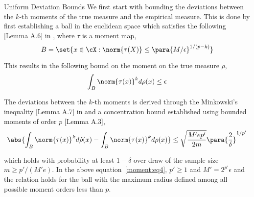 \documentclass[10pt]{article}
\begin{document}
\begin{psection}{Uniform Deviation Bounds}
    We first start with bounding the deviations between the $k$-th
    moments of the true measure and the empirical measure. This is done by first
    establishing a ball in the euclidean space which satisfies the following
    [Lemma A.6] in \citep{telgarsky2013moment}, where $\tau$ is a moment map,  
    \begin{equation}
        \label{moment:eq2}
        B = \set{x \in \cX : \norm{\tau(X)} \leq \para{M/\epsilon}^{1/(p - k)}}
    \end{equation}

    This results in the following bound on the moment on the true measure $\rho$,
    \begin{equation}
        \label{moment:eq3}
        \int_{B} \norm{\tau(x)}^k d\rho(x) \leq \epsilon
    \end{equation}

    The deviations between the $k$-th moments is derived through the Minkowski's
    inequality [Lemma A.7] in \citep{telgarsky2013moment} and a concentration bound
    established using bounded moments of order $p$ [Lemma
    A.3]\cite{telgarsky2013moment},
    \begin{equation}
        \label{moment:eq4}
        \abs{\int_B \norm{\tau(x)}^k d\hat{\rho}(x) - \int_B \norm{\tau(x)}^k d{\rho}(x)} \leq \sqrt{\frac{M' e p'}{2m}}\para{\frac{2}{\delta}}^{1/p'}
    \end{equation}

    which holds with probability at least $1 - \delta$ over draw of the sample size
    $m \geq p'/(M'e)$. In the above equation~\ref{moment:eq4}, $p'\geq 1$ and 
    $M' = 2^{p'}\epsilon$ and the relation holds for the ball with the maximum radius
    defined among all possible moment orders less than $p$.


\end{psection}
\end{document}
